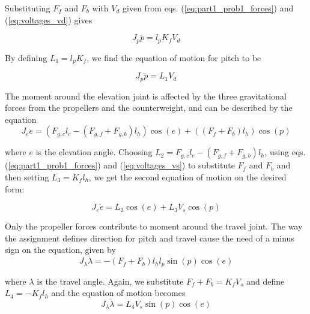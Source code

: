 Substituting $F_f$ and $F_b$ with $V_d$ given from eqs. (\ref{eq:part1_prob1_forces}) and (\ref{eq:voltages_vd}) gives

\begin{equation}
    J_p \ddot{p} = l_p K_f V_d
\end{equation}

By defining $L_1 = l_p K_f$, we find the equation of motion for pitch to be

\begin{equation} \label{eq:model_pitch}
    J_p \ddot{p} = L_1 V_d
\end{equation}

The moment around the elevation joint is affected by the three gravitational forces from the propellers and the counterweight, and can be described by the equation
\begin{equation}
    J_e \ddot{e} = (F_{g, c} l_{c} - (F_{g, f} + F_{g, b}) l_h) \cos (e) + ((F_f + F_b) l_h) \cos(p)
\end{equation}

where $e$ is the elevation angle. Choosing $L_2 = F_{g, c} l_c - (F_{g, f} + F_{g, b}) l_h$, using eqs. (\ref{eq:part1_prob1_forces}) and (\ref{eq:voltages_vs}) to substitute $F_f$ and $F_b$ and then setting $L_3 = K_f l_h$, we get the second equation of motion on the desired form:

\begin{equation} \label{eq:model_elev}
    J_e \ddot{e} = L_2 \cos (e) + L_3 V_s \cos (p)
\end{equation}



Only the propeller forces contribute to moment around the travel joint. The way the assignment defines direction for pitch and travel cause the need of a minus sign on the equation, given by
\begin{equation}
    J_{\lambda} \ddot{\lambda} = -(F_f + F_b) l_h l_p \sin (p) \cos (e)
\end{equation}

where $\lambda$ is the travel angle. Again, we substitute $F_f + F_b = K_f V_s$ and define $L_4 = -K_f l_h$ and the equation of motion becomes
\begin{equation}
    J_{\lambda} \ddot{\lambda} = L_4 V_s \sin (p) \cos (e)
\end{equation}

